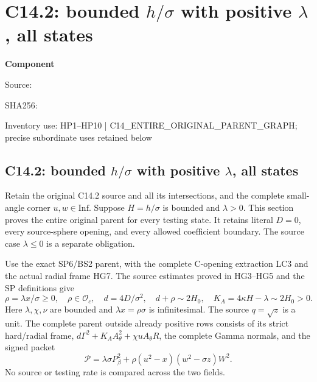 \chapter{C14.2: bounded $h/\sigma$ with positive $\lambda$, all states}
\label{component:p021ed4a9e0db}
\noindent\textbf{Component }\par
{\small\noindent Source: \par}
{\small\noindent SHA256: \par}
{\small\noindent Inventory use: HP1--HP10 | C14\_\allowbreak{}ENTIRE\_\allowbreak{}ORIGINAL\_\allowbreak{}PARENT\_\allowbreak{}GRAPH; precise subordinate uses retained below\par}
\medskip
\section{C14.2: bounded $h/\sigma$ with positive $\lambda$, all states}
\label{p021ed4a9e0db:sec:r19-c142-positive-lambda}

Retain the original C14.2 source and all its intersections, and the
complete small-angle corner $u,w\in\mathrm{Inf}$.  Suppose
$H=h/\sigma$ is bounded and $\lambda>0$.  This section proves the
entire original parent for every testing state.  It retains literal
$D=0$, every source-sphere opening, and every allowed coefficient
boundary.  The source case $\lambda\le0$ is a separate obligation.

Use the exact SP6/BS2 parent, with the complete C-opening extraction
LC3 and the actual radial frame HG7.  The source estimates proved
in HG3--HG5 and the SP definitions give
\[
 \rho=\lambda x/\sigma\ge0,\quad \rho\in\mathcal O_c,
 \quad d=4D/\sigma^2,\quad
 d+\rho\sim2H_0,
 \quad K_A=4\kappa H-\lambda\sim2H_0>0.
 \tag{HP1}
\]
Here $\lambda,\chi,\nu$ are bounded and $\lambda x=\rho\sigma$
is infinitesimal.  The source $q=\sqrt z$ is a unit.  The complete
parent outside already positive rows consists of its strict hard/radial
frame, $d\Gamma^2+K_A A_\theta^2+\chi uA_\theta R$, the complete
Gamma normals, and the signed packet
\[
 \mathscr P=\lambda\sigma P_\beta^2+
      \rho(u^2-x)(w^2-\sigma z)W^2.
 \tag{HP2}
\]
No source or testing rate is compared across the two fields.

